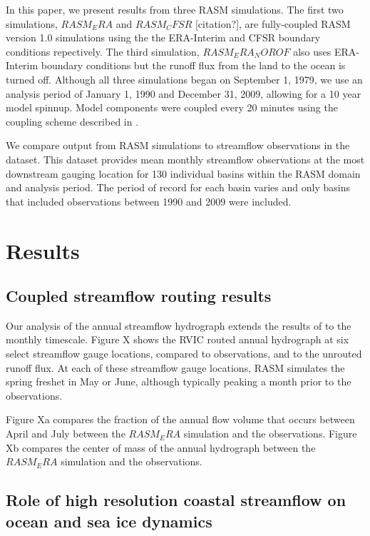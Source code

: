 \documentclass[ms, draft]{agutex}
\begin{document}
\begin{article}
In this paper, we present results from three RASM simulations.
The first two simulations, $RASM_ERA$ \citep{Dee_2011} and $RASM_CFSR$ [citation?], are fully-coupled RASM version 1.0 simulations using the the ERA-Interim and CFSR boundary conditions repectively.
The third simulation, $RASM_ERA_NOROF$ also uses ERA-Interim boundary conditions but the runoff flux from the land to the ocean is turned off.
Although all three simulations began on September 1, 1979, we use an analysis period of January 1, 1990 and December 31, 2009, allowing for a 10 year model spinnup.
Model components were coupled every 20 minutes using the coupling scheme described in \citep{Roberts_2015a}.

We compare output from RASM simulations to streamflow observations in the \citet{Dai_2009} dataset.
This dataset provides mean monthly streamflow observations at the most downstream gauging location for 130 individual basins within the RASM domain and analysis period.
The period of record for each basin varies and only basins that included observations between 1990 and 2009 were included.

\section{Results}

\subsection{Coupled streamflow routing results}

Our analysis of the annual streamflow hydrograph extends the results of \citet{Hamman_2015} to the monthly timescale.
Figure X shows the RVIC routed annual hydrograph at six select streamflow gauge locations, compared to observations, and to the unrouted runoff flux.
At each of these streamflow gauge locations, RASM simulates the spring freshet in May or June, although typically peaking a month prior to the observations.

Figure Xa compares the fraction of the annual flow volume that occurs between April and July between the $RASM_ERA$ simulation and the observations.
Figure Xb compares the center of mass of the annual hydrograph between the $RASM_ERA$ simulation and the observations.

\subsection{Role of high resolution coastal streamflow on ocean and sea ice dynamics}


\end{article}
\end{document}
